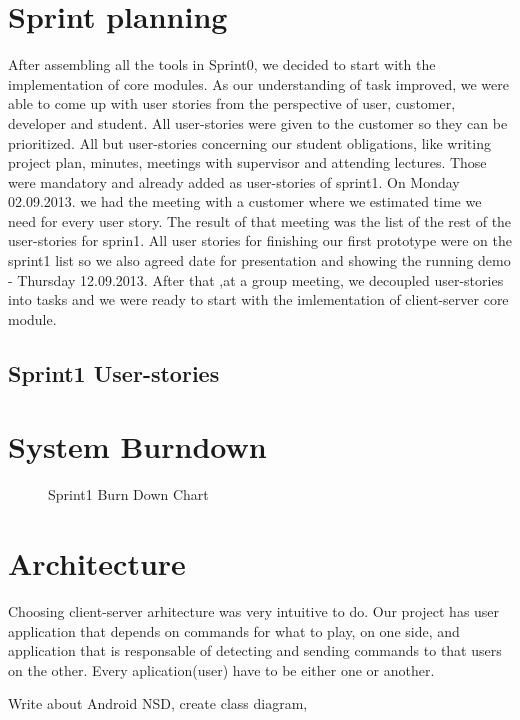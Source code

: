 \section{Sprint planning}
After assembling all the tools in Sprint0, we decided to start with the implementation of core modules.
As our understanding of task improved, we were able to come up with user stories from the perspective of user, customer, developer and student.
All user-stories were given to the customer so they can be prioritized. 
All but user-stories concerning our student obligations, like writing project plan, minutes, meetings with supervisor and attending lectures.
Those were mandatory and already added as user-stories of sprint1.
On Monday 02.09.2013. we had the meeting with a customer where we estimated time we need for every user story.
The result of that meeting was the list of the rest of the user-stories for sprin1.
All user stories for finishing our first prototype were on the sprint1 list so we also agreed date for presentation and showing the running demo - Thursday 12.09.2013. 
After that ,at a group meeting, we decoupled user-stories into tasks and we were ready to start with the imlementation of client-server core module.


\subsection{Sprint1 User-stories}

\section{System Burndown}

\begin{figure}[H]
	\centering
	\caption{Sprint1 Burn Down Chart}
	\label{fig:sprint1_burn_down_chart}
\end{figure}

\section{Architecture}

Choosing client-server arhitecture was very intuitive to do.
Our project has user application that depends on commands for what to play, on one side, and application that is responsable of detecting and sending commands to that users on the other.
Every aplication(user) have to be either one or another. 

Write about Android NSD, create class diagram, 


